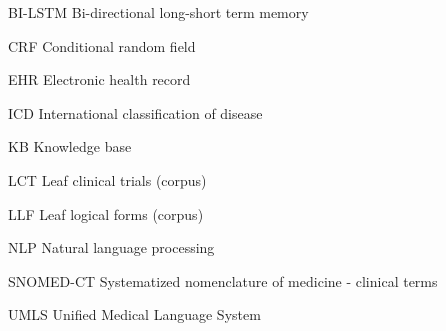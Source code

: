\documentclass[../main.tex]{subfiles}
\begin{document}
\begin{glossary}
\item[BI-LSTM] Bi-directional long-short term memory
\item[CRF] Conditional random field
\item[EHR] Electronic health record
\item[ICD] International classification of disease
\item[KB] Knowledge base
\item[LCT] Leaf clinical trials (corpus)
\item[LLF] Leaf logical forms (corpus)
\item[NLP] Natural language processing
\item[SNOMED-CT] Systematized nomenclature of medicine - clinical terms
\item[UMLS] Unified Medical Language System
 
\end{glossary}
\end{document}
